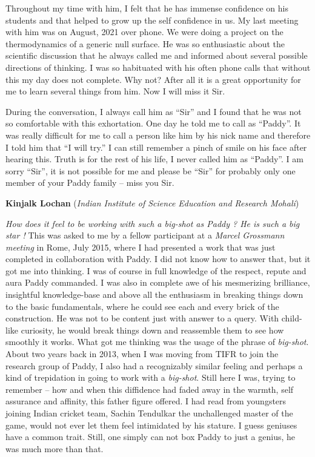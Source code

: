 \documentclass[prd, preprint, longbibliography, 11pt]{revtex4-1}
\begin{document}
Throughout my time with him, I felt that he has immense confidence on his students and that helped to grow up the self confidence in us.  My last meeting with him was on August, 2021 over phone. We were doing a project on the thermodynamics of a generic null surface. He was so enthusiastic  about the scientific discussion that he always called me and informed about several possible directions of thinking. I was so habituated with his often phone calls that without this my day does not complete. Why not? After all it is a great opportunity for me to learn several things from him. Now I will miss it Sir. 

During the conversation, I always call him as ``Sir'' and I found that he was not so comfortable with this exhortation. One day he told me to call as ``Paddy''. It was really difficult for me to call a person like him by his nick name and therefore I told him that ``I will try.'' I can still remember a pinch of smile on his face after hearing this. Truth is for the rest of his life, I never called him as ``Paddy''. I am sorry ``Sir'', it is not possible for me and please be ``Sir'' for probably only one member of your Paddy family -- miss you Sir.



\bigskip
\bigskip

\centerline{{\bf Kinjalk Lochan} ({\it Indian Institute of Science Education and Research Mohali})}
\medskip
{}

\textit{How does it feel to be working with such a big-shot as Paddy ? He is such a big star ! } This  was asked to me by a  fellow participant at a \textit{Marcel Grossmann meeting} in Rome, July 2015,  where I had presented a work that was  just completed in collaboration with Paddy. I did not know how to answer that, but it got me into thinking. I was of course in full knowledge of the respect, repute and aura Paddy commanded. I was also in complete awe of his mesmerizing brilliance, insightful knowledge-base and above all the enthusiasm in breaking things down to the basic fundamentals, where he could see each and every brick of the construction. He was not to be content just with answer to a query. With child-like curiosity, he would break things down and reassemble them to see how smoothly it works. What got me thinking was the usage of the  phrase of \textit{big-shot}. About two years back in 2013, when I was moving from TIFR to join the research group of Paddy, I also had a recognizably similar feeling and perhaps a kind of trepidation in going to work with a \textit{big-shot}.  Still here I was, trying to remember -- how and when this diffidence  had faded away in the warmth, self assurance and affinity, this father figure offered. I had read from youngsters joining Indian cricket team,  Sachin Tendulkar the unchallenged master of the game, would not ever let them feel intimidated by his stature. I guess geniuses have a common trait. Still, one simply can not box Paddy to just a genius, he was much more than that.
\end{document}
